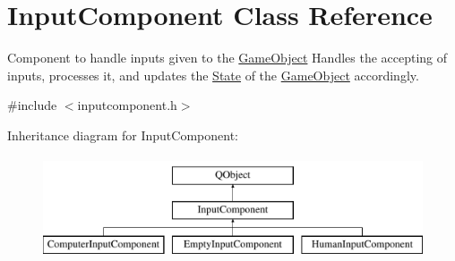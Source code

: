 \hypertarget{classInputComponent}{\section{Input\-Component Class Reference}
\label{classInputComponent}
}


Component to handle inputs given to the \hyperlink{classGameObject}{Game\-Object} Handles the accepting of inputs, processes it, and updates the \hyperlink{classState}{State} of the \hyperlink{classGameObject}{Game\-Object} accordingly.  




{\ttfamily \#include $<$inputcomponent.\-h$>$}

Inheritance diagram for Input\-Component\-:\begin{figure}[H]
\begin{center}
\leavevmode
\includegraphics[height=3.000000cm]{classInputComponent}
\end{center}
\end{figure}
